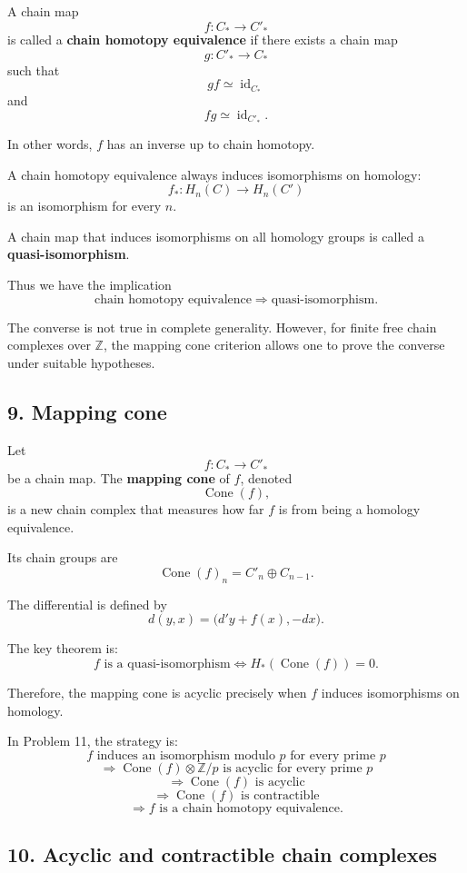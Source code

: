 \documentclass[12pt,a4paper]{article}
\theoremstyle{notespace}
\begin{document}
A chain map
\[
f:C_*\to C'_*
\]
is called a \textbf{chain homotopy equivalence} if there exists a chain map
\[
g:C'_*\to C_*
\]
such that
\[
gf\simeq \operatorname{id}_{C_*}
\]
and
\[
fg\simeq \operatorname{id}_{C'_*}.
\]

In other words, \(f\) has an inverse up to chain homotopy.

A chain homotopy equivalence always induces isomorphisms on homology:
\[
f_*:H_n(C)\to H_n(C')
\]
is an isomorphism for every \(n\).

A chain map that induces isomorphisms on all homology groups is called a \textbf{quasi-isomorphism}.

Thus we have the implication
\[
\text{chain homotopy equivalence}
\Longrightarrow
\text{quasi-isomorphism}.
\]

The converse is not true in complete generality. However, for finite free chain complexes over \(\mathbb Z\), the mapping cone criterion allows one to prove the converse under suitable hypotheses.

\subsection*{9. Mapping cone}

Let
\[
f:C_*\to C'_*
\]
be a chain map. The \textbf{mapping cone} of \(f\), denoted
\[
\operatorname{Cone}(f),
\]
is a new chain complex that measures how far \(f\) is from being a homology equivalence.

Its chain groups are
\[
\operatorname{Cone}(f)_n=C'_n\oplus C_{n-1}.
\]

The differential is defined by
\[
d(y,x)=\bigl(d'y+f(x),-dx\bigr).
\]

The key theorem is:
\[
f \text{ is a quasi-isomorphism}
\iff
H_*(\operatorname{Cone}(f))=0.
\]

Therefore, the mapping cone is acyclic precisely when \(f\) induces isomorphisms on homology.

In Problem 11, the strategy is:
\[
f \text{ induces an isomorphism modulo }p
\text{ for every prime }p
\]
\[
\Longrightarrow
\operatorname{Cone}(f)\otimes \mathbb Z/p
\text{ is acyclic for every prime }p
\]
\[
\Longrightarrow
\operatorname{Cone}(f)
\text{ is acyclic}
\]
\[
\Longrightarrow
\operatorname{Cone}(f)
\text{ is contractible}
\]
\[
\Longrightarrow
f
\text{ is a chain homotopy equivalence}.
\]

\subsection*{10. Acyclic and contractible chain complexes}
\end{document}
